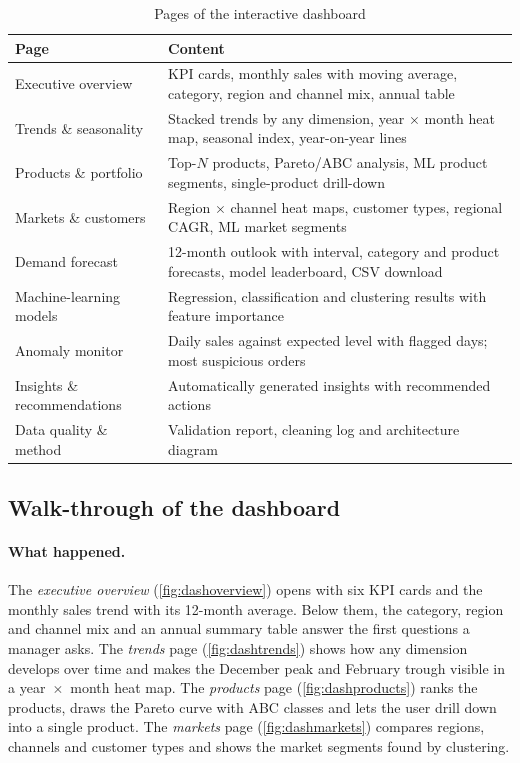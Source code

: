 \begin{table}[htbp]\centering\small
\caption{Pages of the interactive dashboard}\label{tab:pages}
\begin{tabularx}{\linewidth}{@{}lX@{}}
\toprule
\textbf{Page} & \textbf{Content} \\ \midrule
Executive overview & KPI cards, monthly sales with moving average, category, region and channel mix, annual table \\
Trends \& seasonality & Stacked trends by any dimension, year $\times$ month heat map, seasonal index, year-on-year lines \\
Products \& portfolio & Top-$N$ products, Pareto/ABC analysis, ML product segments, single-product drill-down \\
Markets \& customers & Region $\times$ channel heat maps, customer types, regional CAGR, ML market segments \\
Demand forecast & 12-month outlook with interval, category and product forecasts, model leaderboard, CSV download \\
Machine-learning models & Regression, classification and clustering results with feature importance \\
Anomaly monitor & Daily sales against expected level with flagged days; most suspicious orders \\
Insights \& recommendations & Automatically generated insights with recommended actions \\
Data quality \& method & Validation report, cleaning log and architecture diagram \\ \bottomrule
\end{tabularx}
\end{table}

\subsection{Walk-through of the dashboard}
\paragraph{What happened.} The \emph{executive overview} (\cref{fig:dashoverview}) opens with six KPI cards and
the monthly sales trend with its 12-month average. Below them, the category, region and channel mix and an
annual summary table answer the first questions a manager asks. The \emph{trends} page
(\cref{fig:dashtrends}) shows how any dimension develops over time and makes the December peak and February
trough visible in a year~$\times$~month heat map. The \emph{products} page (\cref{fig:dashproducts}) ranks the
products, draws the Pareto curve with ABC classes and lets the user drill down into a single product. The
\emph{markets} page (\cref{fig:dashmarkets}) compares regions, channels and customer types and shows the
market segments found by clustering.

